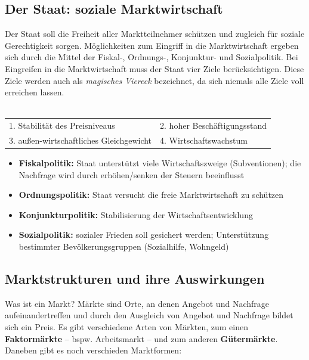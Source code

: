 \subsection{Der Staat: soziale Marktwirtschaft}

Der Staat soll die Freiheit aller Marktteilnehmer schützen und zugleich für soziale Gerechtigkeit sorgen. Möglichkeiten zum Eingriff in die Marktwirtschaft ergeben sich durch die Mittel der Fiskal-, Ordnungs-, Konjunktur- und Sozialpolitik. Bei Eingreifen in die Marktwirtschaft muss der Staat vier Ziele berücksichtigen. Diese Ziele werden auch als {\it magisches Viereck} bezeichnet, da sich niemals alle Ziele voll erreichen lassen.\\\\
\begin{tabular}{ll}
1. Stabilität des Preisniveaus & 2. hoher Beschäftigungsstand\\
3. außen-wirtschaftliches Gleichgewicht & 4. Wirtschaftswachstum\\
\end{tabular}

\begin{itemize}
\setlength\itemsep{0em}
	\item {\bf Fiskalpolitik:} Staat unterstützt viele Wirtschaftszweige (Subventionen); die Nachfrage wird durch erhöhen/senken der Steuern beeinflusst
	\item {\bf Ordnungspolitik:} Staat versucht die freie Marktwirtschaft zu schützen
	\item {\bf Konjunkturpolitik:} Stabilisierung der Wirtschaftsentwicklung
	\item {\bf Sozialpolitik:} sozialer Frieden soll gesichert werden; Unterstützung bestimmter Bevölkerungsgruppen (Sozialhilfe, Wohngeld)
\end{itemize}
	

\subsection{Marktstrukturen und ihre Auswirkungen}

Was ist ein Markt? Märkte sind Orte, an denen Angebot und Nachfrage aufeinandertreffen und durch den Ausgleich von Angebot und Nachfrage bildet sich ein Preis. Es gibt verschiedene Arten von Märkten, zum einen {\bf Faktormärkte} -- bspw. Arbeitsmarkt -- und zum anderen {\bf Gütermärkte}. Daneben gibt es noch verschieden Marktformen:


